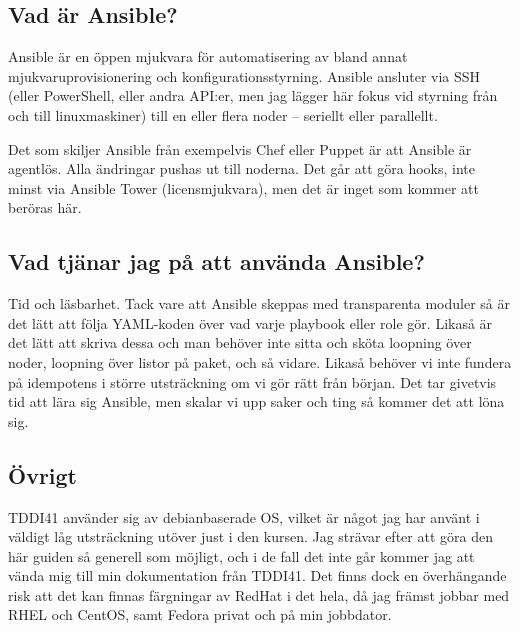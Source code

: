 \subsection{Vad är Ansible?}
Ansible är en öppen mjukvara för automatisering av bland annat mjukvaruprovisionering och konfigurationsstyrning. Ansible ansluter via SSH (eller PowerShell, eller andra API:er, men jag lägger här fokus vid styrning från och till linuxmaskiner) till en eller flera noder -- seriellt eller parallellt.

Det som skiljer Ansible från exempelvis Chef eller Puppet är att Ansible är agentlös. Alla ändringar pushas ut till noderna. Det går att göra hooks, inte minst via Ansible Tower (licensmjukvara), men det är inget som kommer att beröras här.

\subsection{Vad tjänar jag på att använda Ansible?}
Tid och läsbarhet. Tack vare att Ansible skeppas med transparenta moduler så är det lätt att följa YAML-koden över vad varje playbook eller role gör. 
Likaså är det lätt att skriva dessa och man behöver inte sitta och sköta loopning över noder, loopning över listor på paket, och så vidare. Likaså behöver vi inte fundera på idempotens i större utsträckning om vi gör rätt från början.
Det tar givetvis tid att lära sig Ansible, men skalar vi upp saker och ting så kommer det att löna sig.

\subsection{Övrigt}
TDDI41 använder sig av debianbaserade OS, vilket är något jag har använt i väldigt låg utsträckning utöver just i den kursen. Jag strävar efter att göra den här guiden så generell som möjligt, och i de fall det inte går
kommer jag att vända mig till min dokumentation från TDDI41. Det finns dock en överhängande risk att det kan finnas färgningar av RedHat i det hela, då jag främst jobbar med RHEL och CentOS, samt Fedora privat och på min jobbdator.
